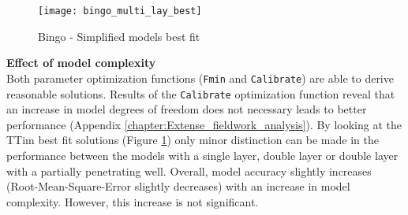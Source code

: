 \begin{figure}[h!]
 \centering
 \texttt{[image: bingo\_multi\_lay\_best]}
 \captionsetup{justification=centering} 
 \caption{Bingo - Simplified models best fit}
 \label{fig:Bingo_best}
\end{figure}

\textbf{Effect of model complexity} \\
Both parameter optimization functions (\texttt{Fmin} and \texttt{Calibrate}) are able to derive reasonable solutions. Results of the \texttt{Calibrate} optimization function reveal that an increase in model degrees of freedom does not necessary leads to better performance (Appendix \ref{chapter:Extense_fieldwork_analysis}). By looking at the TTim best fit solutions (Figure \ref{fig:Bingo_best}) only minor distinction can be made in the performance between the models with a single layer, double layer or double layer with a partially penetrating well. Overall, model accuracy slightly increases (Root-Mean-Square-Error slightly decreases) with an increase in model complexity. However, this increase is not significant.


